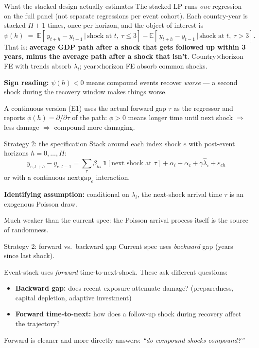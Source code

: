 \documentclass[aspectratio=169]{beamer}
\begin{document}
\begin{frame}{What the stacked design actually estimates}
The stacked LP runs \emph{one} regression on the full panel (not separate regressions per event cohort). Each country-year is stacked $H+1$ times, once per horizon, and the object of interest is
\[
  \psi(h) \;=\; \mathbb{E}\!\left[\,y_{t+h} - y_{t-1} \,\big|\, \text{shock at }t,\ \tau \leq 3\right]
             - \mathbb{E}\!\left[\,y_{t+h} - y_{t-1} \,\big|\, \text{shock at }t,\ \tau > 3\right].
\]
That is: \textbf{average GDP path after a shock that gets followed up within 3 years, minus the average path after a shock that isn't}. Country$\times$horizon FE with trends absorb $\lambda_i$; year$\times$horizon FE absorb common shocks.

\medskip
\textbf{Sign reading:} $\psi(h) < 0$ means compound events recover \emph{worse} --- a second shock during the recovery window makes things worse.

\medskip
A continuous version (E1) uses the actual forward gap $\tau$ as the regressor and reports $\phi(h) = \partial/\partial \tau$ of the path: $\phi > 0$ means longer time until next shock $\Rightarrow$ less damage $\Rightarrow$ compound more damaging.
\end{frame}

\begin{frame}{Strategy 2: the specification}
Stack around each index shock $e$ with post-event horizons $h = 0, \ldots, H$:
\[
  y_{e,t+h} - y_{e,t-1}
  = \sum_{\tau} \beta_{h\tau}\,\mathbf{1}[\text{next shock at }\tau]
  + \alpha_i + \alpha_c + \gamma \hat\lambda_i + \varepsilon_{eh}
\]
or with a continuous $\mathrm{nextgap}_e$ interaction.

\medskip
\textbf{Identifying assumption:} conditional on $\lambda_i$, the next-shock arrival time $\tau$ is an exogenous Poisson draw.

\medskip
Much weaker than the current spec: the Poisson arrival process itself is the source of randomness.
\end{frame}

\begin{frame}{Strategy 2: forward vs.\ backward gap}
Current spec uses \emph{backward} gap (years since last shock).

\medskip
Event-stack uses \emph{forward} time-to-next-shock. These ask different questions:
\begin{itemize}
  \item \textbf{Backward gap:} does recent exposure attenuate damage? (preparedness, capital depletion, adaptive investment)
  \item \textbf{Forward time-to-next:} how does a follow-up shock during recovery affect the trajectory?
\end{itemize}

\medskip
Forward is cleaner and more directly answers: \emph{``do compound shocks compound?''}
\end{frame}
\end{document}
